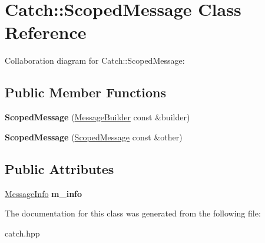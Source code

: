 \hypertarget{classCatch_1_1ScopedMessage}{}\section{Catch\+:\+:Scoped\+Message Class Reference}
\label{classCatch_1_1ScopedMessage}


Collaboration diagram for Catch\+:\+:Scoped\+Message\+:
\subsection*{Public Member Functions}
\begin{DoxyCompactItemize}
\item 
{\bfseries Scoped\+Message} (\hyperlink{structCatch_1_1MessageBuilder}{Message\+Builder} const \&builder)\hypertarget{classCatch_1_1ScopedMessage_a5cc59f0f2ebe840e6607f83004d49a17}{}\label{classCatch_1_1ScopedMessage_a5cc59f0f2ebe840e6607f83004d49a17}

\item 
{\bfseries Scoped\+Message} (\hyperlink{classCatch_1_1ScopedMessage}{Scoped\+Message} const \&other)\hypertarget{classCatch_1_1ScopedMessage_ae03a17fd47220d563d4abc73e7518e29}{}\label{classCatch_1_1ScopedMessage_ae03a17fd47220d563d4abc73e7518e29}

\end{DoxyCompactItemize}
\subsection*{Public Attributes}
\begin{DoxyCompactItemize}
\item 
\hyperlink{structCatch_1_1MessageInfo}{Message\+Info} {\bfseries m\+\_\+info}\hypertarget{classCatch_1_1ScopedMessage_ae6e1476f389cc6e1586f033b3747b27b}{}\label{classCatch_1_1ScopedMessage_ae6e1476f389cc6e1586f033b3747b27b}

\end{DoxyCompactItemize}


The documentation for this class was generated from the following file\+:\begin{DoxyCompactItemize}
\item 
catch.\+hpp\end{DoxyCompactItemize}
